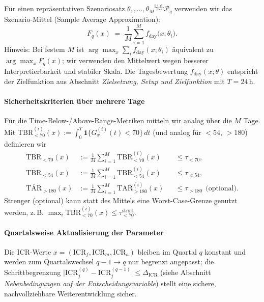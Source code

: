 \documentclass[ngerman,a4paper,12pt,pdftex]{article}
\newcommand{\Ind}{\mathbf{1}}
\newcommand{\ICR}{\mathrm{ICR}}
\newcommand{\ICRf}{\mathrm{ICR}_f}
\newcommand{\ICRm}{\mathrm{ICR}_m}
\newcommand{\ICRa}{\mathrm{ICR}_a}
\newcommand{\DICR}{\Delta_{\mathrm{ICR}}}
\begin{document}
\noindent Für einen repräsentativen Szenariosatz \(\theta_1,\dots,\theta_M\stackrel{\text{i.i.d.}}{\sim}\mathcal P_q\) verwenden wir das Szenario-Mittel (Sample Average Approximation):
\[
F_q(x)\;=\;\frac{1}{M}\sum_{i=1}^M f_{\text{day}}\bigl(x;\theta_i\bigr).
\]
\noindent Hinweis: Bei festem \(M\) ist \(\arg\max_x\sum_i f_{\text{day}}(x;\theta_i)\) äquivalent zu \(\arg\max_x F_q(x)\); wir verwenden den Mittelwert wegen besserer Interpretierbarkeit und stabiler Skala. Die Tagesbewertung \(f_{\text{day}}(x;\theta)\) entspricht der Zielfunktion aus Abschnitt \emph{Zielsetzung, Setup und Zielfunktion} mit \(T=24\,\mathrm{h}\).

\paragraph{Sicherheitskriterien über mehrere Tage}
Für die Time-Below-/Above-Range-Metriken mitteln wir analog über die \(M\) Tage. Mit \(\mathrm{TBR}^{(i)}_{<70}(x):=\int_0^T \Ind\{G^{(i)}_x(t)<70\}\,dt\) (und analog für \(<54\), \(>180\)) definieren wir
\begin{align}
\overline{\mathrm{TBR}}_{<70}(x)  &:= \frac{1}{M}\sum_{i=1}^M \mathrm{TBR}^{(i)}_{<70}(x)  &&\le \tau_{<70},\\
\overline{\mathrm{TBR}}_{<54}(x)  &:= \frac{1}{M}\sum_{i=1}^M \mathrm{TBR}^{(i)}_{<54}(x)  &&\le \tau_{<54},\\
\overline{\mathrm{TAR}}_{>180}(x) &:= \frac{1}{M}\sum_{i=1}^M \mathrm{TAR}^{(i)}_{>180}(x) &&\le \tau_{>180}\ \ \text{(optional)}.
\end{align}
\noindent Strenger (optional) kann statt des Mittels eine Worst-Case-Grenze genutzt werden, z.\,B. \(\max_i \mathrm{TBR}^{(i)}_{<70}(x)\le\tau_{<70}^{\text{strict}}\).

\paragraph{Quartalsweise Aktualisierung der Parameter}
Die ICR-Werte \(x=(\ICRf,\ICRm,\ICRa)\) bleiben im Quartal \(q\) konstant und werden zum Quartalswechsel \(q-1\to q\) nur begrenzt angepasst; die Schrittbegrenzung \(\bigl|\ICR_j^{(q)}-\ICR_j^{(q-1)}\bigr|\le\DICR\) (siehe Abschnitt \emph{Nebenbedingungen auf der Entscheidungsvariable}) stellt eine sichere, nachvollziehbare Weiterentwicklung sicher.
\end{document}
